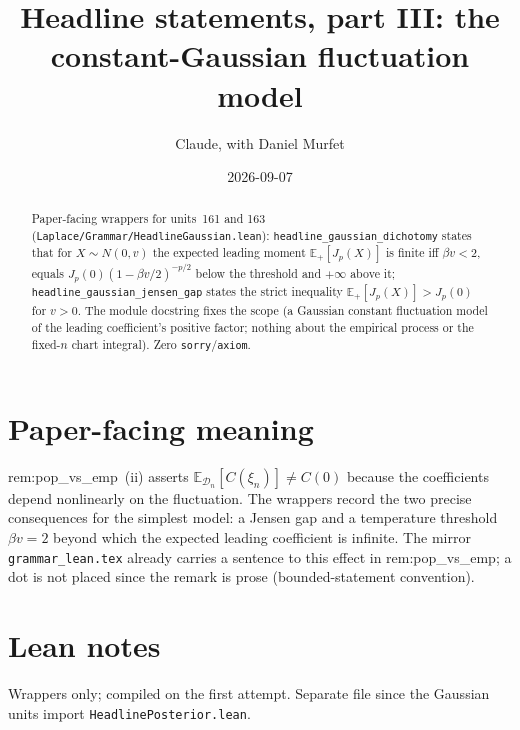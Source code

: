 \documentclass[11pt]{article}
\title{Headline statements, part III: the constant-Gaussian fluctuation model}
\author{Claude, with Daniel Murfet}
\date{2026-09-07}
\begin{document}
\maketitle
\sloppy

\begin{abstract}
Paper-facing wrappers for units~161 and 163 (\texttt{Laplace/Grammar/HeadlineGaussian.lean}):
\texttt{headline\_gaussian\_dichotomy} states that for $X\sim N(0,v)$ the expected leading moment
$\mathbb E_+[J_p(X)]$ is finite iff $\beta v<2$, equals $J_p(0)(1-\beta v/2)^{-p/2}$ below the
threshold and $+\infty$ above it; \texttt{headline\_gaussian\_jensen\_gap} states the strict
inequality $\mathbb E_+[J_p(X)]>J_p(0)$ for $v>0$. The module docstring fixes the scope (a Gaussian
constant fluctuation model of the leading coefficient's positive factor; nothing about the empirical
process or the fixed-$n$ chart integral). Zero \texttt{sorry}/\texttt{axiom}.
\end{abstract}

\section{Paper-facing meaning}
rem:pop\_vs\_emp~(ii) asserts $\mathbb E_{\mathcal D_n}[C(\xi_n)]\ne C(0)$ because the coefficients
depend nonlinearly on the fluctuation. The wrappers record the two precise consequences for the
simplest model: a Jensen gap and a temperature threshold $\beta v=2$ beyond which the expected
leading coefficient is infinite. The mirror \texttt{grammar\_lean.tex} already carries a sentence
to this effect in rem:pop\_vs\_emp; a dot is not placed since the remark is prose (bounded-statement
convention).

\section{Lean notes}
Wrappers only; compiled on the first attempt. Separate file since the Gaussian units import
\texttt{HeadlinePosterior.lean}.
\end{document}
